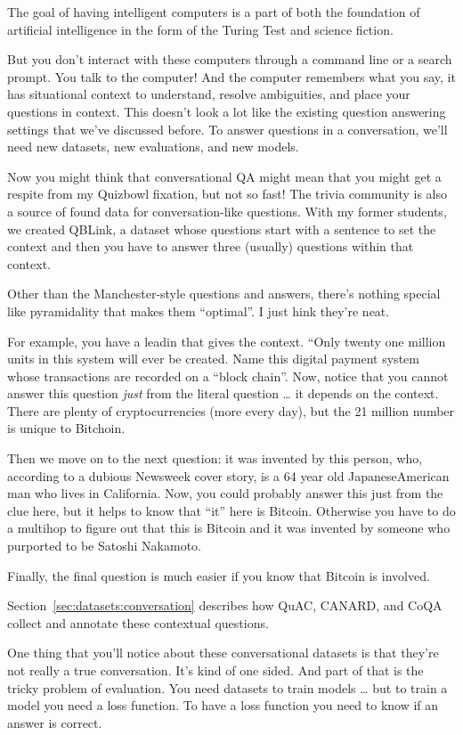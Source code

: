The goal of having intelligent computers is a part of both the foundation of artificial intelligence in the form of the Turing Test and science fiction.

But you don’t interact with these computers through a command line or a search prompt.  You talk to the computer!  And the computer remembers what you say, it has situational context to understand, resolve ambiguities, and place your questions in context.  
This doesn’t look a lot like the existing question answering settings that we’ve discussed before.  To answer questions in a conversation, we’ll need new datasets, new evaluations, and new models.

Now you might think that conversational QA might mean that you might get a respite from my Quizbowl fixation, but not so fast!  The trivia community is also a source of found data for conversation-like questions.  With my former students, we created QBLink, a dataset whose questions start with a sentence to set the context and then you have to answer three (usually) questions within that context.  

Other than the Manchester-style questions and answers, there’s nothing special like pyramidality that makes them “optimal”.  I just hink they’re neat.

For example, you have a leadin that gives the context.  “Only twenty­ one million units in this system will ever be created. Name this digital payment system whose transactions are recorded on a “block chain”. Now, notice that you cannot answer this question \emph{just} from the literal question … it depends on the context.  There are plenty of cryptocurrencies (more every day), but the 21 million number is unique to Bitchoin.

Then we move on to the next question: it was invented by this person, who, according to a dubious Newsweek cover story, is a 64­ year ­old Japanese­American man who lives in California.  Now, you could probably answer this just from the clue here, but it helps to know that “it” here is Bitcoin.  Otherwise you have to do a multihop to figure out that this is Bitcoin and it was invented by someone who purported to be Satoshi Nakamoto.

Finally, the final question is much easier if you know that Bitcoin is involved.

Section~\ref{sec:datasets:conversation} describes how QuAC, CANARD, and CoQA collect and annotate these contextual questions.

One thing that you’ll notice about these conversational datasets is that they’re not really a true conversation.  It’s kind of one sided.  And part of that is the tricky problem of evaluation.  You need datasets to train models … but to train a model you need a loss function.  To have a loss function you need to know if an answer is correct.  

